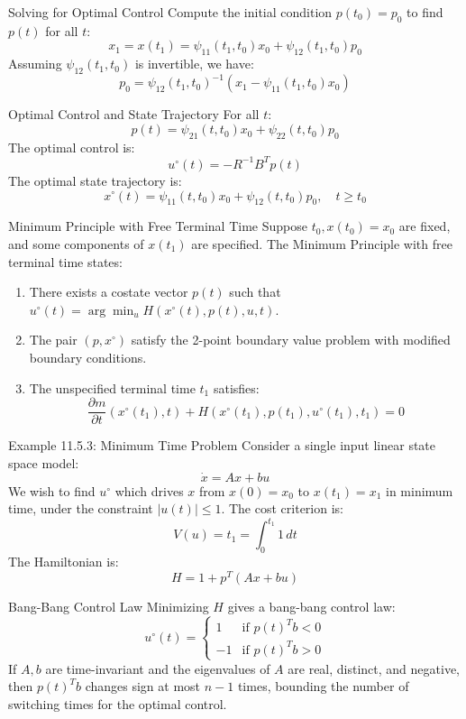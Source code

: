 \documentclass[10pt]{beamer}
\begin{document}
\begin{frame}[fragile]{Solving for Optimal Control}
  Compute the initial condition \( p(t_0) = p_0 \) to find \( p(t) \) for all \( t \):
  \[
  x_1 = x(t_1) = \psi_{11}(t_1, t_0) x_0 + \psi_{12}(t_1, t_0) p_0
  \]
  Assuming \( \psi_{12}(t_1, t_0) \) is invertible, we have:
  \[
  p_0 = \psi_{12}(t_1, t_0)^{-1} (x_1 - \psi_{11}(t_1, t_0) x_0)
  \]
\end{frame}
  
\begin{frame}[fragile]{Optimal Control and State Trajectory}
  For all \( t \):
  \[
  p(t) = \psi_{21}(t, t_0) x_0 + \psi_{22}(t, t_0) p_0
  \]
  The optimal control is:
  \[
  u^\circ(t) = -R^{-1} B^T p(t)
  \]
  The optimal state trajectory is:
  \[
  x^\circ(t) = \psi_{11}(t, t_0) x_0 + \psi_{12}(t, t_0) p_0, \quad t \ge t_0
  \]
\end{frame}
  
\begin{frame}[fragile]{Minimum Principle with Free Terminal Time}
  Suppose \( t_0, x(t_0) = x_0 \) are fixed, and some components of \( x(t_1) \) are specified. The Minimum Principle with free terminal time states:
  \begin{enumerate}
      \item There exists a costate vector \( p(t) \) such that \( u^\circ(t) = \arg \min_u H(x^\circ(t), p(t), u, t) \).
      \item The pair \( (p, x^\circ) \) satisfy the 2-point boundary value problem with modified boundary conditions.
      \item The unspecified terminal time \( t_1 \) satisfies:
      \[
      \frac{\partial m}{\partial t}(x^\circ(t_1), t) + H(x^\circ(t_1), p(t_1), u^\circ(t_1), t_1) = 0
      \]
  \end{enumerate}
\end{frame}
  
\begin{frame}[fragile]{Example 11.5.3: Minimum Time Problem}
  Consider a single input linear state space model:
  \[
  \dot{x} = Ax + bu
  \]
  We wish to find \( u^\circ \) which drives \( x \) from \( x(0) = x_0 \) to \( x(t_1) = x_1 \) in minimum time, under the constraint \( |u(t)| \le 1 \). The cost criterion is:
  \[
  V(u) = t_1 = \int_0^{t_1} 1 \, dt
  \]
  The Hamiltonian is:
  \[
  H = 1 + p^T(Ax + bu)
  \]
\end{frame}
  
\begin{frame}[fragile]{Bang-Bang Control Law}
  Minimizing \( H \) gives a bang-bang control law:
  \[
  u^\circ(t) = \begin{cases}
  1 & \text{if } p(t)^T b < 0 \\
  -1 & \text{if } p(t)^T b > 0
  \end{cases}
  \]
  If \( A, b \) are time-invariant and the eigenvalues of \( A \) are real, distinct, and negative, then \( p(t)^T b \) changes sign at most \( n - 1 \) times, bounding the number of switching times for the optimal control.
\end{frame}
  
\end{document}
